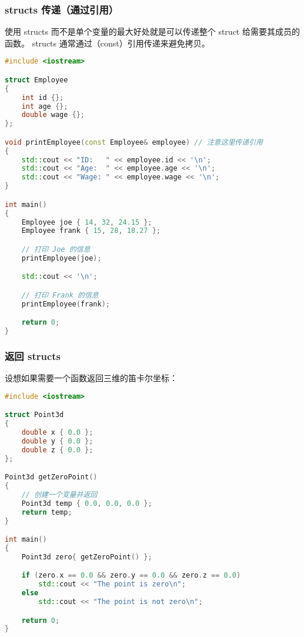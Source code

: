 \documentclass[../../LearnCpp.tex]{subfiles}
\begin{document}

\subsubsection*{structs 传递（通过引用）}

使用 structs 而不是单个变量的最大好处就是可以传递整个 struct 给需要其成员的函数。
structs 通常通过（const）引用传递来避免拷贝。

\begin{lstlisting}[language=C++]
#include <iostream>

struct Employee
{
    int id {};
    int age {};
    double wage {};
};

void printEmployee(const Employee& employee) // 注意这里传递引用
{
    std::cout << "ID:   " << employee.id << '\n';
    std::cout << "Age:  " << employee.age << '\n';
    std::cout << "Wage: " << employee.wage << '\n';
}

int main()
{
    Employee joe { 14, 32, 24.15 };
    Employee frank { 15, 28, 18.27 };

    // 打印 Joe 的信息
    printEmployee(joe);

    std::cout << '\n';

    // 打印 Frank 的信息
    printEmployee(frank);

    return 0;
}
\end{lstlisting}

\subsubsection*{返回 structs}

设想如果需要一个函数返回三维的笛卡尔坐标：

\begin{lstlisting}[language=C++]
#include <iostream>

struct Point3d
{
    double x { 0.0 };
    double y { 0.0 };
    double z { 0.0 };
};

Point3d getZeroPoint()
{
    // 创建一个变量并返回
    Point3d temp { 0.0, 0.0, 0.0 };
    return temp;
}

int main()
{
    Point3d zero{ getZeroPoint() };

    if (zero.x == 0.0 && zero.y == 0.0 && zero.z == 0.0)
        std::cout << "The point is zero\n";
    else
        std::cout << "The point is not zero\n";

    return 0;
}
\end{lstlisting}
\end{document}
